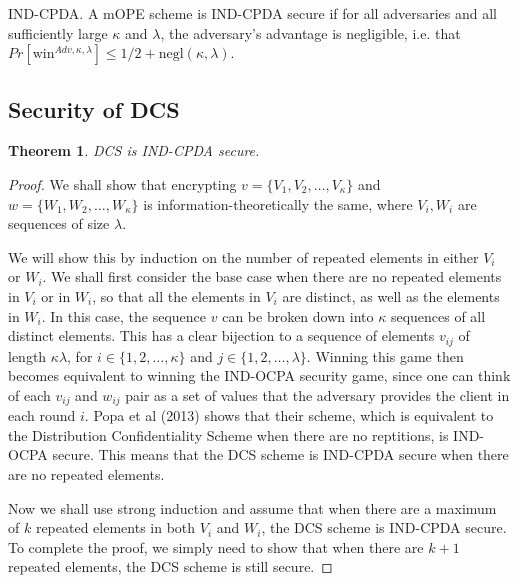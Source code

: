 \documentclass[12pt]{article}
\newtheorem{theorem}{Theorem}[section]
\newenvironment{definition}[1][Definition]{\begin{trivlist}
\item[\hskip \labelsep {\bfseries #1}]}{\end{trivlist}}
\begin{document}
\begin{definition}
  IND-CPDA. A mOPE scheme is IND-CPDA secure if for all adversaries and all sufficiently large $\kappa$ and $\lambda$, the adversary's advantage is negligible, i.e. that $Pr[\textrm{win}^{Adv, \kappa, \lambda}] \leq 1/2 + \textrm{negl}(\kappa, \lambda)$.
\end{definition}

\subsection{Security of DCS}

\begin{theorem}
  DCS is IND-CPDA secure.
\end{theorem}
\begin{proof}
We shall show that encrypting $v = \{V_1, V_2, \ldots, V_{\kappa} \}$ and $w = \{W_1, W_2, \ldots, W_{\kappa}\}$ is information-theoretically the same, where $V_i, W_i$ are sequences of size $\lambda$.

We will show this by induction on the number of repeated elements in either $V_i$ or $W_i$. We shall first consider the base case when there are no repeated elements in $V_i$ or in $W_i$, so that all the elements in $V_i$ are distinct, as well as the elements in $W_i$. In this case, the sequence $v$ can be broken down into $\kappa$ sequences of all distinct elements. This has a clear bijection to a sequence of elements $v_{ij}$ of length $\kappa \lambda$, for $i \in \{1, 2, \ldots, \kappa\}$ and $j \in \{1, 2, \ldots, \lambda \}$. Winning this game then becomes equivalent to winning the IND-OCPA security game, since one can think of each $v_{ij}$ and $w_{ij}$ pair as a set of values that the adversary provides the client in each round $i$. Popa et al (2013) shows that their scheme, which is equivalent to the Distribution Confidentiality Scheme when there are no reptitions, is IND-OCPA secure. This means that the DCS scheme is IND-CPDA secure when there are no repeated elements.

Now we shall use strong induction and assume that when there are a maximum of $k$ repeated elements in both $V_i$ and $W_i$, the DCS scheme is IND-CPDA secure. To complete the proof, we simply need to show that when there are $k+1$ repeated elements, the DCS scheme is still secure.


\end{proof}
\end{document}
